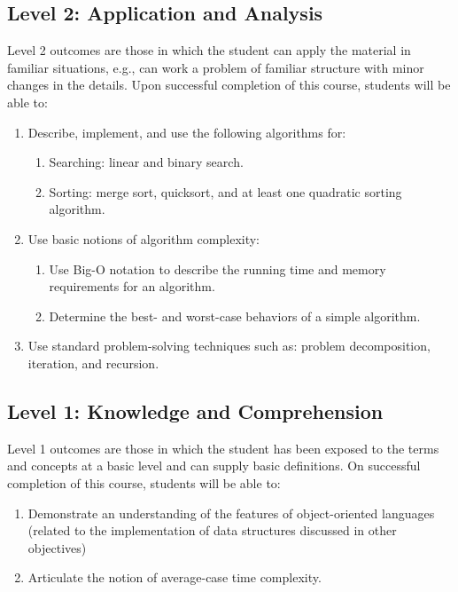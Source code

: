 \documentclass[12pt]{scrartcl}
\begin{document}
\subsection*{Level 2: Application and Analysis}
Level 2 outcomes are those in which the student can apply the material in familiar situations, e.g., can work a problem of familiar structure with minor changes in the details. Upon successful completion of this course, students will be able to:
\begin{enumerate}
    \item Describe, implement, and use the following algorithms for:
    \begin{enumerate}
        \item Searching: linear and binary search.
        \item Sorting: merge sort, quicksort, and at least one quadratic sorting algorithm. 
    \end{enumerate}
    
    
    \item Use basic notions of algorithm complexity:
    \begin{enumerate}
        \item Use Big-O notation to describe the running time and memory requirements for an algorithm. 
        \item Determine the best- and worst-case behaviors of a simple algorithm.
    \end{enumerate}
        
    \item Use standard problem-solving techniques such as: problem decomposition, iteration, and recursion. 
\end{enumerate}

\subsection*{Level 1: Knowledge and Comprehension}
Level 1 outcomes are those in which the student has been exposed to the terms and concepts at a basic level and can supply basic definitions. On successful completion of this course, students will be able to:
\begin{enumerate}
   \item Demonstrate an understanding of the features of object-oriented languages (related to the implementation of data structures discussed in other objectives)
   \item Articulate the notion of average-case time complexity. 
\end{enumerate}


\end{document}
